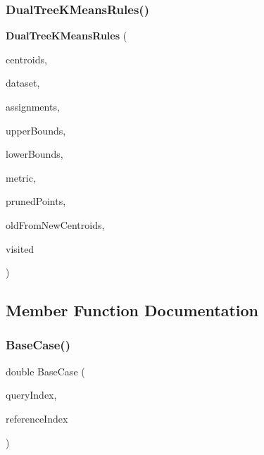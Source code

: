 \subsubsection{Dual\+Tree\+K\+Means\+Rules()}
{\footnotesize\ttfamily \textbf{ Dual\+Tree\+K\+Means\+Rules} (\begin{DoxyParamCaption}\item[{const arma\+::mat \&}]{centroids,  }\item[{const arma\+::mat \&}]{dataset,  }\item[{arma\+::\+Row$<$ size\+\_\+t $>$ \&}]{assignments,  }\item[{arma\+::vec \&}]{upper\+Bounds,  }\item[{arma\+::vec \&}]{lower\+Bounds,  }\item[{Metric\+Type \&}]{metric,  }\item[{const std\+::vector$<$ bool $>$ \&}]{pruned\+Points,  }\item[{const std\+::vector$<$ size\+\_\+t $>$ \&}]{old\+From\+New\+Centroids,  }\item[{std\+::vector$<$ bool $>$ \&}]{visited }\end{DoxyParamCaption})}



\subsection{Member Function Documentation}
\mbox{\label{classmlpack_1_1kmeans_1_1DualTreeKMeansRules_abac50f780bb5e1bc12dd0d16d850cacc}} 
\subsubsection{Base\+Case()}
{\footnotesize\ttfamily double Base\+Case (\begin{DoxyParamCaption}\item[{const size\+\_\+t}]{query\+Index,  }\item[{const size\+\_\+t}]{reference\+Index }\end{DoxyParamCaption})}

\mbox{\label{classmlpack_1_1kmeans_1_1DualTreeKMeansRules_a3f4bd5d0aa64ea090796725f7755287d}} 
